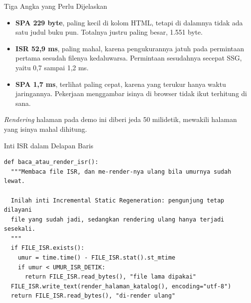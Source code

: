 \documentclass[aspectratio=169, table, 12pt]{beamer}
\begin{document}
\begin{frame}{{\Large Tiga Angka yang Perlu Dijelaskan}}
  \vspace{10pt}
  \begin{itemize}
    \item \textbf{SPA 229 byte}, paling kecil di kolom HTML, tetapi di
          dalamnya tidak ada satu judul buku pun. Totalnya justru paling
          besar, 1.551 byte.
    \item \textbf{ISR 52,9 ms}, paling mahal, karena pengukurannya jatuh
          pada permintaan pertama sesudah filenya kedaluwarsa. Permintaan
          sesudahnya secepat SSG, yaitu 0,7 sampai 1,2 ms.
    \item \textbf{SPA 1,7 ms}, terlihat paling cepat, karena yang terukur
          hanya waktu jaringannya. Pekerjaan menggambar isinya di browser
          tidak ikut terhitung di sana.
  \end{itemize}
  \vspace{6pt}
  {\small \textit{Rendering} halaman pada demo ini diberi jeda 50 milidetik,
  mewakili halaman yang isinya mahal dihitung.}
\end{frame}

\begin{frame}[fragile]{{\Large Inti ISR dalam Delapan Baris}}
  \vspace{2pt}
\begin{lstlisting}[style=PythonStyle]
def baca_atau_render_isr():
  """Membaca file ISR, dan me-render-nya ulang bila umurnya sudah lewat.

  Inilah inti Incremental Static Regeneration: pengunjung tetap dilayani
  file yang sudah jadi, sedangkan rendering ulang hanya terjadi sesekali.
  """
  if FILE_ISR.exists():
    umur = time.time() - FILE_ISR.stat().st_mtime
    if umur < UMUR_ISR_DETIK:
      return FILE_ISR.read_bytes(), "file lama dipakai"
  FILE_ISR.write_text(render_halaman_katalog(), encoding="utf-8")
  return FILE_ISR.read_bytes(), "di-render ulang"
\end{lstlisting}
\end{frame}
\end{document}
